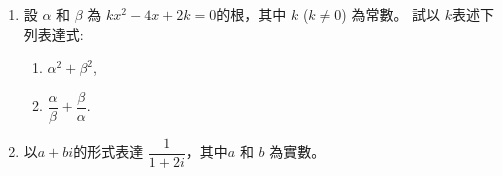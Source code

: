 \documentclass[11pt]{article}
\begin{document}
\begin{enumerate}
            \hrulefill
            
            \hrulefill
            
            \hrulefill
            
            \hrulefill
            
            \hrulefill

        \item 設 $\alpha$ 和 $\beta$ 為 $kx^2-4x+2k=0$的根，其中 $k$ ($k\neq 0$) 為常數。 試以 $k$表述下列表達式:\begin{enumerate}
            \item $\alpha^2+\beta^2$,
            \item $\dfrac{\alpha}{\beta}+\dfrac{\beta}{\alpha}$.
        \end{enumerate}

        \hrulefill

            \hrulefill
            
            \hrulefill
            
            \hrulefill
            
            \hrulefill
            
            \hrulefill
            
            \hrulefill
            
            \hrulefill
            
            \hrulefill
            
            \hrulefill
            
            \hrulefill
            
            \hrulefill

        \pagebreak
        \item 以$a+bi$的形式表達 $\dfrac{1}{1+2i}$，其中$a$ 和 $b$ 為實數。
        
        \hrulefill

            \hrulefill
            
            \hrulefill
            
            \hrulefill
            
            \hrulefill
            
            \hrulefill
            
            \hrulefill
            
            \hrulefill
            
            \hrulefill
            

\end{enumerate}
\end{document}
